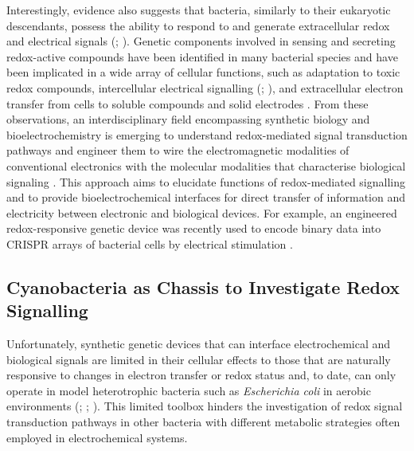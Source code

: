 Interestingly, evidence also suggests that bacteria, similarly to their eukaryotic descendants,  possess the ability to respond to and generate extracellular redox and electrical signals (\citealt{Green2004}; \citealt{Martinez-Corral2019}). Genetic components involved in sensing and secreting redox-active compounds have been identified in many bacterial species and have been implicated in a wide array of cellular functions, such as adaptation to toxic redox compounds, intercellular electrical signalling (\citealt{Prindle201559}; \citealt{Martinez-Corral2018E8333}), and extracellular electron transfer from cells to soluble compounds and solid electrodes \cite{LEASMITH2016247}. From these observations, an interdisciplinary field encompassing synthetic biology and bioelectrochemistry is emerging to understand redox-mediated signal transduction pathways and engineer them to wire the electromagnetic modalities of conventional electronics with the molecular modalities that characterise biological signaling  \citep{Schofield2020}. This approach aims to elucidate functions of redox-mediated signalling and to provide bioelectrochemical interfaces for direct transfer of information and electricity between electronic and biological devices. For example, an engineered redox-responsive genetic device was recently used to encode binary data into CRISPR arrays of bacterial cells by electrical stimulation \citep{Yim2021}.

\subsection{Cyanobacteria as Chassis to Investigate Redox Signalling}

Unfortunately, synthetic genetic devices that can interface electrochemical and biological signals are limited in their cellular effects to those that are naturally responsive to changes in electron transfer or redox status and, to date, can only operate in model heterotrophic bacteria such as \textit{Escherichia coli} in aerobic environments (\citealt{Tschirhart2017}; \citealt{Liu2016}; \citealt{Bhokisham2020}). This limited toolbox hinders the investigation of redox signal transduction pathways in other bacteria with different metabolic strategies often employed in electrochemical systems.

